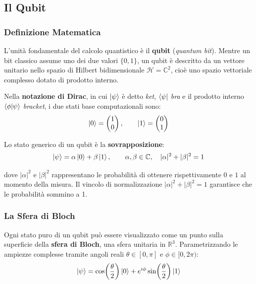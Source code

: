 \begin{onehalfspace}
\clearpage
\subsection{Il Qubit}

\subsubsection{Definizione Matematica}

L'unità fondamentale del calcolo quantistico è il \textbf{qubit} (\textit{quantum bit}). Mentre un bit classico assume uno dei due valori $\{0, 1\}$, un qubit è descritto da un vettore unitario nello spazio di Hilbert bidimensionale $\mathcal{H} = \mathbb{C}^2$, cioè uno spazio vettoriale complesso dotato di prodotto interno.

Nella \textbf{notazione di Dirac}, in cui $\ket{\psi}$ è detto \textit{ket}, $\bra{\psi}$ \textit{bra} e il prodotto interno $\braket{\phi|\psi}$ \textit{bracket}, i due stati base computazionali sono:
\begin{equation}
    \ket{0} = \begin{pmatrix} 1 \\ 0 \end{pmatrix}, \qquad
    \ket{1} = \begin{pmatrix} 0 \\ 1 \end{pmatrix}
\end{equation}

Lo stato generico di un qubit è la \textbf{sovrapposizione}:
\begin{equation}
    \ket{\psi} = \alpha\ket{0} + \beta\ket{1}, \qquad \alpha, \beta \in \mathbb{C}, \quad |\alpha|^2 + |\beta|^2 = 1
\end{equation}

dove $|\alpha|^2$ e $|\beta|^2$ rappresentano le probabilità di ottenere rispettivamente $0$ e $1$ al momento della misura. Il vincolo di normalizzazione $|\alpha|^2 + |\beta|^2 = 1$ garantisce che le probabilità sommino a 1.

\subsubsection{La Sfera di Bloch}

Ogni stato puro di un qubit può essere visualizzato come un punto sulla superficie della \textbf{sfera di Bloch}, una sfera unitaria in $\mathbb{R}^3$. Parametrizzando le ampiezze complesse tramite angoli reali $\theta \in [0, \pi]$ e $\phi \in [0, 2\pi)$:
\begin{equation}
    \ket{\psi} = \cos\!\left(\frac{\theta}{2}\right)\ket{0} + e^{i\phi}\sin\!\left(\frac{\theta}{2}\right)\ket{1}
\end{equation}


\end{onehalfspace}
